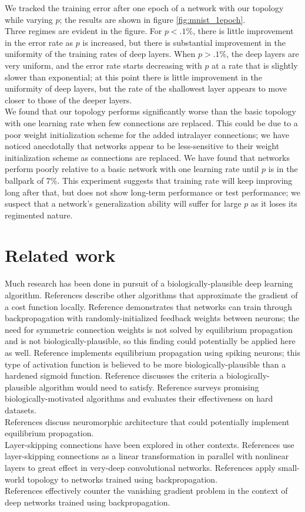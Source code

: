 \documentclass[format=sigconf]{acmart}
\newcommand{\npar}{\\\indent}
\begin{document}
We tracked the training error after one epoch of a network with our topology while varying $p$; the results are shown in figure \ref{fig:mnist_1epoch}.
\npar
Three regimes are evident in the figure. For $p<.1\%$, there is little improvement in the error rate as $p$ is increased, but there is substantial improvement in the uniformity of the training rates of deep layers. When $p>.1\%$, the deep layers are very uniform, and the error rate starts decreasing with $p$ at a rate that is slightly slower than exponential; at this point there is little improvement in the uniformity of deep layers, but the rate of the shallowest layer appears to move closer to those of the deeper layers.
\npar
We found that our topology performs significantly worse than the basic topology with one learning rate when few connections are replaced. This could be due to a poor weight initialization scheme for the added intralayer connections; we have noticed anecdotally that networks appear to be less-sensitive to their weight initialization scheme as connections are replaced. We have found that networks perform poorly relative to a basic network with one learning rate until $p$ is in the ballpark of 7\%. This experiment suggests that training rate will keep improving long after that, but does not show long-term performance or test performance; we suspect that a network's generalization ability will suffer for large $p$ as it loses its regimented nature.

\section{Related work}
Much research has been done in pursuit of a biologically-plausible deep learning algorithm. References \cite{lee2015, xie2003, pineda1987} describe other algorithms that approximate the gradient of a cost function locally. Reference \cite{lillicrap2014} demonstrates that networks can train through backpropagation with randomly-initialized feedback weights between neurons; the need for symmetric connection weights is not solved by equilibrium propagation and is not biologically-plausible, so this finding could potentially be applied here as well. Reference \cite{oconnor2018} implements equilibrium propagation using spiking neurons; this type of activation function is believed to be more biologically-plausible than a hardened sigmoid function. Reference \cite{bengio2015} discusses the criteria a biologically-plausible algorithm would need to satisfy. Reference \cite{bartunov2018} surveys promising biologically-motivated algorithms and evaluates their effectiveness on hard datasets.
\npar
References \cite{shainline2019, davies2018, nahmias2013} discuss neuromorphic architecture that could potentially implement equilibrium propagation.
\npar
Layer-skipping connections have been explored in other contexts. References \cite{he2015, srivastava2015} use layer-skipping connections as a linear transformation in parallel with nonlinear layers to great effect in very-deep convolutional networks. References \cite{xiaohu2011, krishnan2019} apply small-world topology to networks trained using backpropagation.
\npar
References \cite{ioffe2015, glorot2010} effectively counter the vanishing gradient problem in the context of deep networks trained using backpropagation.
\end{document}
